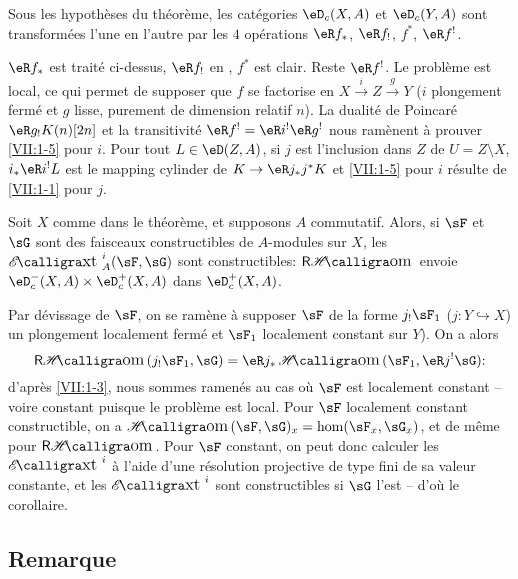 \begin{corollary_}\label{VII:1-5}
Sous les hypothèses du théorème, les catégories $\eD_c(X,A)$ et 
$\eD_c(Y,A)$ sont transformées l'une en l'autre par les $4$ opérations 
$\eR f_\ast$, $\eR f_!$, $f^\ast$, $\eR f^!$. 
\end{corollary_}

$\eR f_\ast$ est traité ci-dessus, $\eR f_!$ en \cite[XVII 5.3]{sga4}, 
$f^\ast$ est clair. Reste $\eR f^!$. Le problème est local, ce qui permet de 
supposer que $f$ se factorise en $X\xrightarrow i Z \xrightarrow g Y$ ($i$ 
plongement fermé et $g$ lisse, purement de dimension relatif $n$). La 
dualité de Poincaré $\eR g_! K(n)[2 n]$ et la transitivité 
$\eR f^! = \eR i^! \eR g^!$ nous ramènent à prouver \ref{VII:1-5} pour $i$. 
Pour tout $L\in \eD(Z,A)$, si $j$ est l'inclusion dans $Z$ de $U=Z\setminus X$, 
$i_\ast \eR i^! L$ est le mapping cylinder de $K\to \eR j_\ast j^\ast K$ et 
\ref{VII:1-5} pour $i$ résulte de \ref{VII:1-1} pour $j$. 





\begin{corollary_}\label{VII:1-6}
Soit $X$ comme dans le théorème, et supposons $A$ commutatif. Alors, si 
$\sF$ et $\sG$ sont des faisceaux constructibles de $A$-modules sur $X$, les 
$\Ext_A^i(\sF,\sG)$ sont constructibles: $\rHom$ envoie 
$\eD_c^-(X,A)\times \eD_c^+(X,A)$ dans $\eD_c^+(X,A)$. 
\end{corollary_}

Par dévissage de $\sF$, on se ramène à supposer $\sF$ de la forme 
$j_!\sF_1$ ($j:Y\hookrightarrow X$) un plongement localement fermé et $\sF_1$ 
localement constant sur $Y$). On a alors 
\[
  \rHom(j_! \sF_1,\sG) = \eR j_\ast \Hom(\sF_1,\eR j^! \sG) \text{:} 
\]
d'après \ref{VII:1-3}, nous sommes ramenés au cas où $\sF$ est localement 
constant -- voire constant puisque le problème est local. Pour $\sF$ 
localement constant constructible, on a $\Hom(\sF,\sG)_x=\hom(\sF_x,\sG_x)$, 
et de même pour $\rHom$. Pour $\sF$ constant, on peut donc calculer les 
$\Ext^i$ à l'aide d'une résolution projective de type fini de sa valeur 
constante, et les $\Ext^i$ sont constructibles si $\sG$ l'est -- d'où le 
corollaire. 





\subsection{Remarque}\label{VII:1-7}

